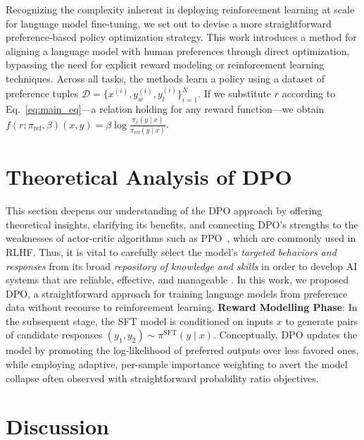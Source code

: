 \begin{lemma}
Recognizing the complexity inherent in deploying reinforcement learning at scale for language model fine-tuning, we set out to devise a more straightforward preference-based policy optimization strategy. This work introduces a method for aligning a language model with human preferences through direct optimization, bypassing the need for explicit reward modeling or reinforcement learning techniques. Across all tasks, the methods learn a policy using a dataset of preference tuples $\mathcal{D}=\bigl\{x^{(i)}, y_w^{(i)}, y_l^{(i)}\bigr\}_{i=1}^N$. If we substitute $r$ according to Eq.~\ref{eq:main_eq}—a relation holding for any reward function—we obtain $f(r; \pi_\text{ref}, \beta)(x, y) = \beta \log \frac{\pi_r(y\mid x)}{\pi_\text{ref}(y\mid x)}$. \section{Theoretical Analysis of DPO} This section deepens our understanding of the DPO approach by offering theoretical insights, clarifying its benefits, and connecting DPO’s strengths to the weaknesses of actor-critic algorithms such as PPO~\cite{schulman2017proximal}, which are commonly used in RLHF. Thus, it is vital to carefully select the model’s \emph{targeted behaviors and responses} from its broad \textit{repository of knowledge and skills} in order to develop AI systems that are reliable, effective, and manageable \citep{ouyang2022training}. In this work, we proposed DPO, a straightforward approach for training language models from preference data without recourse to reinforcement learning. \textbf{Reward Modelling Phase}: In the subsequent stage, the SFT model is conditioned on inputs $x$ to generate pairs of candidate responses $(y_1, y_2)\sim \pi^\text{SFT}(y \mid x)$. Conceptually, DPO updates the model by promoting the log-likelihood of preferred outputs over less favored ones, while employing adaptive, per-sample importance weighting to avert the model collapse often observed with straightforward probability ratio objectives. \section{Discussion}

\end{lemma}
